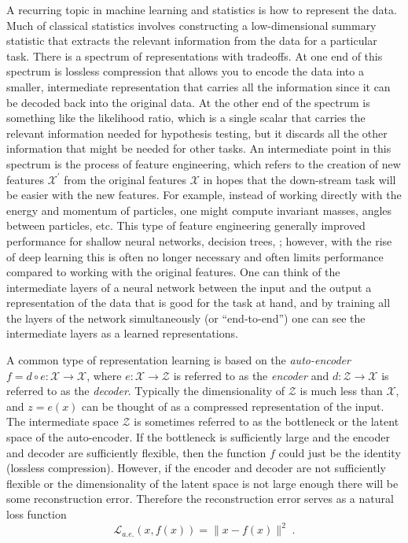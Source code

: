 A recurring topic in machine learning and statistics is how to represent the data. Much of classical statistics involves constructing a low-dimensional summary statistic that extracts the relevant information from the data for a particular task. There is a spectrum of representations with tradeoffs. At one end of this spectrum is lossless compression that allows you to encode the data into a smaller, intermediate representation that carries all the information since it can be decoded back into the original data. At the other end of the spectrum is something like the likelihood ratio, which is a single scalar that carries the relevant information needed for hypothesis testing, but it discards all the other information that might be needed for other tasks. An intermediate point in this spectrum is the process of feature engineering, which refers to the creation of new features $\mathcal{X}^\prime$ from the original features $\mathcal{X}$ in hopes that the down-stream task will be easier with the new features. For example, instead of working directly with the energy and momentum of particles, one might compute invariant masses, angles between particles, etc. This type of feature engineering generally improved performance for shallow neural networks, decision trees, \etc; however, with the rise of deep learning this is often no longer necessary and often limits performance compared to working with the original features. One can think of the intermediate layers of a neural network between the input and the output a representation of the data that is good for the task at hand, and by training all the layers of the network simultaneously (or ``end-to-end'') one can see the intermediate layers as a learned representations. 


A common type of representation learning is based on the \textit{auto-encoder} $f = d\circ e:\mathcal{X}\to \mathcal{X}$, where $e:\mathcal{X}\to \mathcal{Z}$ is referred to as the \textit{encoder} and  $d:\mathcal{Z}\to \mathcal{X}$ is referred to as the \textit{decoder}. Typically the dimensionality of $\mathcal{Z}$ is much less than $\mathcal{X}$, and $z=e(x)$ can be thought of as a compressed representation of the input. The intermediate space $\mathcal{Z}$ is sometimes referred to as the bottleneck or the latent space of the auto-encoder. If the bottleneck is sufficiently large and the encoder and decoder are sufficiently flexible, then the function $f$ could just be the identity (\ie lossless compression). However, if the encoder and decoder are not sufficiently flexible or the dimensionality of the latent space is not large enough there will be some reconstruction error. Therefore the reconstruction error serves as a natural loss function
\begin{equation}
    \label{ML:eq:reconstruction_error}
    \mathcal{L}_{a.e.}(x, f(x)) = \lVert x - f(x) \rVert^2 \;.
\end{equation}

